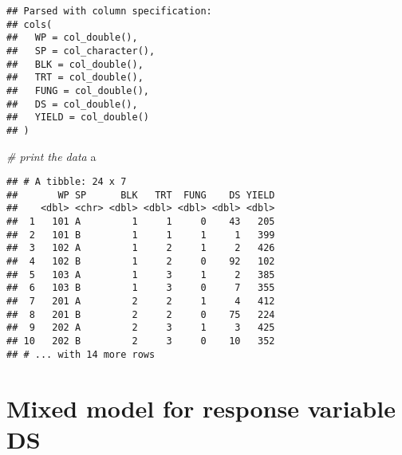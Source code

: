 \documentclass[]{book}
\newenvironment{Shaded}{\begin{snugshade}}{\end{snugshade}}
\newcommand{\CommentTok}[1]{\textcolor[rgb]{0.56,0.35,0.01}{\textit{#1}}}
\newcommand{\KeywordTok}[1]{\textcolor[rgb]{0.13,0.29,0.53}{\textbf{#1}}}
\newcommand{\NormalTok}[1]{#1}
\newcommand{\OperatorTok}[1]{\textcolor[rgb]{0.81,0.36,0.00}{\textbf{#1}}}
\newcommand{\StringTok}[1]{\textcolor[rgb]{0.31,0.60,0.02}{#1}}
\begin{document}
\begin{verbatim}
## Parsed with column specification:
## cols(
##   WP = col_double(),
##   SP = col_character(),
##   BLK = col_double(),
##   TRT = col_double(),
##   FUNG = col_double(),
##   DS = col_double(),
##   YIELD = col_double()
## )
\end{verbatim}

\begin{Shaded}
\begin{Highlighting}[]
\CommentTok{# print the data}
\NormalTok{a}
\end{Highlighting}
\end{Shaded}

\begin{verbatim}
## # A tibble: 24 x 7
##       WP SP      BLK   TRT  FUNG    DS YIELD
##    <dbl> <chr> <dbl> <dbl> <dbl> <dbl> <dbl>
##  1   101 A         1     1     0    43   205
##  2   101 B         1     1     1     1   399
##  3   102 A         1     2     1     2   426
##  4   102 B         1     2     0    92   102
##  5   103 A         1     3     1     2   385
##  6   103 B         1     3     0     7   355
##  7   201 A         2     2     1     4   412
##  8   201 B         2     2     0    75   224
##  9   202 A         2     3     1     3   425
## 10   202 B         2     3     0    10   352
## # ... with 14 more rows
\end{verbatim}

\begin{Shaded}
\end{Shaded}

\hypertarget{mixed-model-for-response-variable-ds}{%
\section{Mixed model for response variable DS}\label{mixed-model-for-response-variable-ds}}
\end{document}

